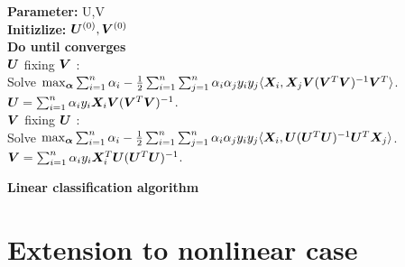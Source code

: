 \documentclass[12pt]{article}
\begin{document}
 \begin{algorithm}[h]
 \label{alg:linear}
{\bf Parameter:} U,V\\
{\bf Initizlize:} $\bm{U}^{(0)}, \bm{V}^{(0)}$\\
{\bf Do until converges}\\
\hspace*{.5cm}{\bf Update} $\bm{U}$ fixing $\bm{V}$ :\\[.1cm]
\hspace*{.4cm} Solve $ \max_{\bm\alpha}\sum_{i=1}^n\alpha_i-\frac{1}{2}\sum_{i=1}^n \sum_{j=1}^n\alpha_i\alpha_jy_iy_j\langle \bm X_i,\bm X_j\bm{V}(\bm{V}^T\bm{V})^{-1}\bm{V}^T\rangle$.\\
\hspace{.5cm} $\bm{U} = \sum_{i=1}^n\alpha_iy_i \bm X_i\bm{V}(\bm{V}^T\bm{V})^{-1}$.\\[.1cm]
\hspace*{.5cm}{\bf Update} $\bm{V}$ fixing $\bm{U}$ :\\[.1cm]
\hspace*{.4cm} Solve  $ \max_{\bm\alpha}\sum_{i=1}^n\alpha_i-\frac{1}{2}\sum_{i=1}^n\sum_{j=1}^n\alpha_i\alpha_jy_iy_j\langle \bm X_i,\bm{U}(\bm{U}^T\bm{U})^{-1}\bm{U}^T\bm X_j\rangle$.\\
\hspace{.5cm} $\bm{V} = \sum_{i=1}^n\alpha_iy_i \bm X_i^T\bm{U}(\bm{U}^T\bm{U})^{-1}$.\\[.1cm]
    \caption{{\bf Linear classification algorithm} }
\label{alg:smm}
\end{algorithm}

\section{Extension to nonlinear case}
\end{document}
